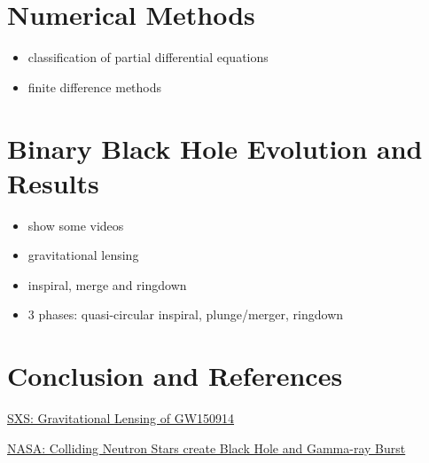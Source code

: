 \documentclass[twocolumn]{article}
\begin{document}
  \section{Numerical Methods} %
  \label{sec:numerical_methods}
    \begin{itemize}
      \item classification of partial differential equations
      \item finite difference methods
    \end{itemize}

  \section{Binary Black Hole Evolution and Results} %
  \label{sec:binary_black_hole_evolution_and_results}
    \begin{itemize}
      \item show some videos
      \item gravitational lensing
      \item inspiral, merge and ringdown
    \end{itemize}

    \begin{itemize}
      \item 3 phases: quasi-circular inspiral, plunge/merger, ringdown
    \end{itemize}

  \section{Conclusion and References} %
  \label{sec:references}


  \href{run:videos/sxs-bbh-gravitational_lensing_of_gw150914.webm}{SXS: Gravitational Lensing of GW150914}

  \href{run:videos/nasa-colliding_neutron_stars_create_black_hole_and_gamma-ray_burst.webm}{NASA: Colliding Neutron Stars create Black Hole and Gamma-ray Burst}

  \nocite{*}
  

\end{document}
